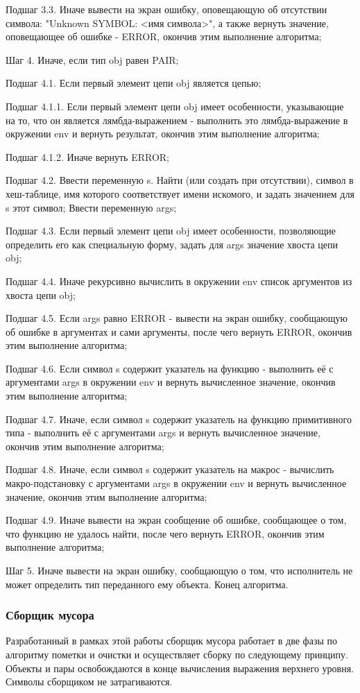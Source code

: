 Подшаг 3.3. Иначе вывести на экран ошибку, оповещающую об отсутствии символа: "Unknown SYMBOL: <имя символа>", а также вернуть значение, оповещающее об ошибке - ERROR, окончив этим выполнение алгоритма;

Шаг 4. Иначе, если тип obj равен PAIR;

Подшаг 4.1. Если первый элемент цепи obj является цепью;

Подшаг 4.1.1. Если первый элемент цепи obj имеет особенности, указывающие на то, что он является лямбда-выражением - выполнить это лямбда-выражение в окружении env и вернуть результат, окончив этим выполнение алгоритма;

Подшаг 4.1.2. Иначе вернуть ERROR;

Подшаг 4.2. Ввести переменную s. Найти (или создать при отсутствии), символ в хеш-таблице, имя которого соответствует имени искомого, и задать значением для s этот символ; Ввести переменную args;

Подшаг 4.3. Если первый элемент цепи obj имеет особенности, позволяющие определить его как специальную форму, задать для args значение хвоста цепи obj;

Подшаг 4.4. Иначе рекурсивно вычислить в окружении env список аргументов из хвоста цепи obj;

Подшаг 4.5. Если args равно ERROR - вывести на экран ошибку, сообщающую об ошибке в аргументах и сами аргументы, после чего вернуть ERROR, окончив этим выполнение алгоритма;

Подшаг 4.6. Если символ s содержит указатель на функцию - выполнить её с аргументами args в окружении env и вернуть вычисленное значение, окончив этим выполнение алгоритма;

Подшаг 4.7. Иначе, если символ s содержит указатель на функцию примитивного типа - выполнить её с аргументами args и вернуть вычисленное значение, окончив этим выполнение алгоритма;

Подшаг 4.8. Иначе, если символ s содержит указатель на макрос - вычислить макро-подстановку с аргументами args в окружении env и вернуть вычисленное значение, окончив этим выполнение алгоритма;

Подшаг 4.9. Иначе вывести на экран сообщение об ошибке, сообщающее о том, что функцию не удалось найти, после чего вернуть ERROR, окончив этим выполнение алгоритма;

Шаг 5. Иначе вывести на экран ошибку, сообщающую о том, что исполнитель не может определить тип переданного ему объекта. Конец алгоритма.

\subsubsection{Сборщик мусора}
Разработанный в рамках этой работы сборщик мусора работает в две фазы по алгоритму пометки и очистки и осуществляет сборку по следующему принципу.
Объекты и пары освобождаются в конце вычисления выражения верхнего уровня. Символы сборщиком не затрагиваются.

